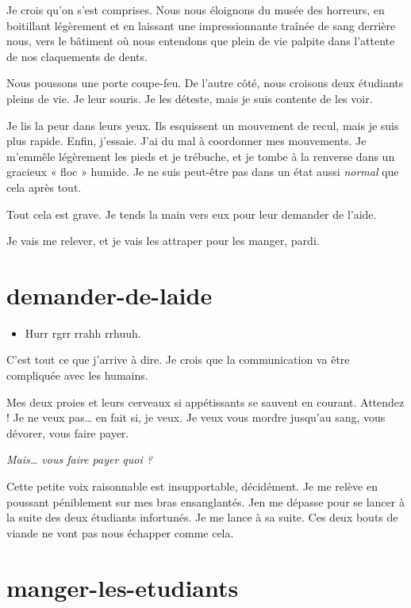 Je crois qu'on s'est comprises. Nous nous éloignons du musée des horreurs, en boitillant légèrement et en laissant une impressionnante traînée de sang derrière nous, vers le bâtiment où nous entendons que plein de vie palpite dans l'attente de nos claquements de dents.

Nous poussons une porte coupe-feu. De l'autre côté, nous croisons deux étudiants pleins de vie. Je leur souris. Je les déteste, mais je suis contente de les voir.

Je lis la peur dans leurs yeux. Ils esquissent un mouvement de recul, mais je suis plus rapide. Enfin, j'essaie. J'ai du mal à coordonner mes mouvements. Je m'emmêle légèrement les pieds et je trébuche, et je tombe à la renverse dans un gracieux « floc » humide. Je ne suis peut-être pas dans un état aussi \textit{normal} que cela après tout.

\item Tout cela est grave. Je tends la main vers eux pour leur demander de l'aide. 
\item Je vais me relever, et je vais les attraper pour les manger, pardi. 
\enw

\section{demander-de-laide}

\begin{itemize}
\item Hurr rgrr rrahh rrhuuh.
\end{itemize}

C'est tout ce que j'arrive à dire. Je crois que la communication va être compliquée avec les humains.

Mes deux proies et leurs cerveaux si appétissants se sauvent en courant. Attendez ! Je ne veux pas… en fait si, je veux. Je veux vous mordre jusqu'au sang, vous dévorer, vous faire payer.

\textit{Mais… vous faire payer quoi ?}

Cette petite voix raisonnable est insupportable, décidément. Je me relève en poussant péniblement sur mes bras ensanglantés. Jen me dépasse pour se lancer à la suite des deux étudiants infortunés. Je me lance à sa suite. Ces deux bouts de viande ne vont pas nous échapper comme cela.

\section{manger-les-etudiants} 

